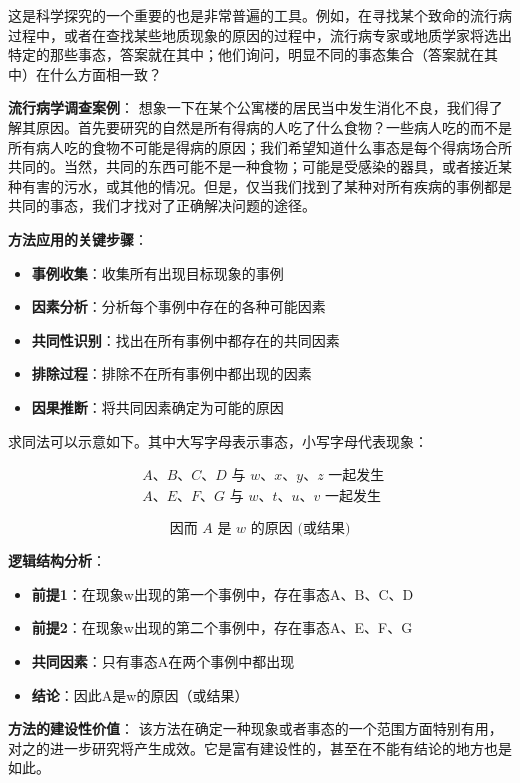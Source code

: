 \begin{examplebox}[title=求同法在科学探究中的应用]
这是科学探究的一个重要的也是非常普遍的工具。例如，在寻找某个致命的流行病过程中，或者在查找某些地质现象的原因的过程中，流行病专家或地质学家将选出特定的那些事态，答案就在其中；他们询问，明显不同的事态集合（答案就在其中）在什么方面相一致？

\textbf{流行病学调查案例}：
想象一下在某个公寓楼的居民当中发生消化不良，我们得了解其原因。首先要研究的自然是所有得病的人吃了什么食物？一些病人吃的而不是所有病人吃的食物不可能是得病的原因；我们希望知道什么事态是每个得病场合所共同的。当然，共同的东西可能不是一种食物；可能是受感染的器具，或者接近某种有害的污水，或其他的情况。但是，仅当我们找到了某种对所有疾病的事例都是共同的事态，我们才找对了正确解决问题的途径。

\textbf{方法应用的关键步骤}：
\begin{itemize}
\item \textbf{事例收集}：收集所有出现目标现象的事例
\item \textbf{因素分析}：分析每个事例中存在的各种可能因素
\item \textbf{共同性识别}：找出在所有事例中都存在的共同因素
\item \textbf{排除过程}：排除不在所有事例中都出现的因素
\item \textbf{因果推断}：将共同因素确定为可能的原因
\end{itemize}
\end{examplebox}

\begin{theorembox}[title=求同法的形式结构]
求同法可以示意如下。其中大写字母表示事态，小写字母代表现象：

$$
\begin{aligned}
& A 、 B 、 C 、 D \text { 与 } w 、 x 、 y 、 z \text { 一起发生 } \\
& A 、 E 、 F 、 G \text { 与 } w 、 t 、 u 、 v \text { 一起发生 }
\end{aligned}
$$

$$
\text { 因而 } A \text { 是 } w \text { 的原因 (或结果) }
$$

\textbf{逻辑结构分析}：
\begin{itemize}
\item \textbf{前提1}：在现象w出现的第一个事例中，存在事态A、B、C、D
\item \textbf{前提2}：在现象w出现的第二个事例中，存在事态A、E、F、G
\item \textbf{共同因素}：只有事态A在两个事例中都出现
\item \textbf{结论}：因此A是w的原因（或结果）
\end{itemize}

\textbf{方法的建设性价值}：
该方法在确定一种现象或者事态的一个范围方面特别有用，对之的进一步研究将产生成效。它是富有建设性的，甚至在不能有结论的地方也是如此。
\end{theorembox}


